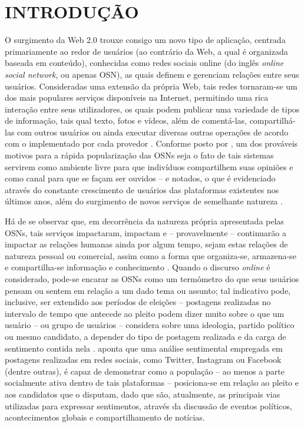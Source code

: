 
\chapter{INTRODUÇÃO}
\label{chap:introducao}
O surgimento da Web 2.0 trouxe consigo um novo tipo de aplicação, centrada primariamente ao redor de usuários (ao contrário da Web, a qual é organizada baseada em conteúdo), conhecidas como redes sociais online (do inglês \textit{online social network}, ou apenas OSN), as quais definem e gerenciam relações entre seus usuários. Consideradas uma extensão da própria Web, tais redes tornaram-se um dos mais populares serviços disponíveis na Internet, permitindo uma rica interação entre seus utilizadores, os quais podem publicar uma variedade de tipos de informação, tais qual texto, fotos e vídeos, além de comentá-las, compartilhá-las com outros usuários ou ainda executar diversas outras operações de acordo com o implementado por cada provedor \cite{pallis2011online,mislove2007measurement}. Conforme posto por , um dos prováveis motivos para a rápida popularização das OSNs seja o fato de tais sistemas servirem como ambiente livre para que indivíduos compartilhem suas opiniões e como canal para que se façam ser ouvidos -- e notados, o que é evidenciado através do constante crescimento de usuários das plataformas existentes nos últimos anos, além do surgimento de novos serviços de semelhante natureza \cite{pallis2011online}. 
\par
Há de se observar que, em decorrência da natureza própria apresentada pelas OSNs, tais serviços impactaram, impactam e -- provavelmente -- continuarão a impactar as relações humanas ainda por algum tempo, sejam estas relações de natureza pessoal ou comercial, assim como a forma que organiza-se, armazena-se e compartilha-se informação e conhecimento \cite{mislove2007measurement}. Quando o discurso \textit{online} é considerado, pode-se encarar as OSNs como um termômetro do que seus usuários pensam ou sentem em relação a um dado tema ou assunto; tal indicativo pode, inclusive, ser extendido aos períodos de eleições -- postagens realizadas no intervalo de tempo que antecede ao pleito podem dizer muito sobre o que um usuário -- ou grupo de usuários -- considera sobre uma ideologia, partido político ou mesmo candidato, a depender do tipo de postagem realizada e da carga de sentimento contida  nela \cite{shevtsov2020analysis}.  aponta que uma análise sentimental empregada em postagens realizadas em redes sociais, como Twitter, Instagram ou Facebook (dentre outras), é capaz de demonstrar como a população -- ao menos a parte socialmente ativa dentro de tais plataformas -- posiciona-se em relação ao pleito e aos candidatos que o disputam, dado que são, atualmente, as principais vias utilizadas para expressar sentimentos, através da discussão de eventos políticos, acontecimentos globais e compartilhamento de notícias.
